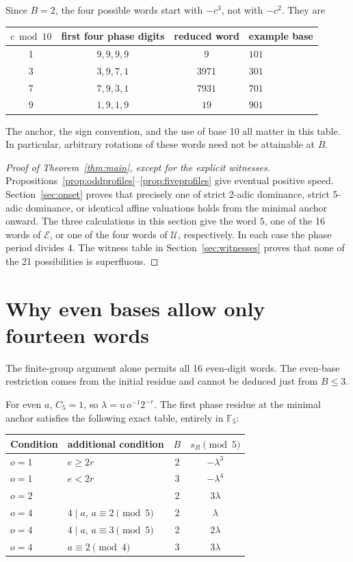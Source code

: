 \documentclass[11pt,letterpaper]{article}
\numberwithin{equation}{section}
\theoremstyle{definition}
\newcommand{\F}{\mathbb F}
\newcommand{\Eset}{\mathcal E}
\newcommand{\Uset}{\mathcal U}
\begin{document}
Since $B=2$, the four possible words start with $-c^3$, not with $-c^2$.
They are
\begin{center}
\begin{tabular}{cccl}
\toprule
$c\bmod10$ & first four phase digits & reduced word & example base\\
\midrule
1 & $9,9,9,9$ & $9$ & $101$\\
3 & $3,9,7,1$ & $3971$ & $301$\\
7 & $7,9,3,1$ & $7931$ & $701$\\
9 & $1,9,1,9$ & $19$ & $901$\\
\bottomrule
\end{tabular}
\end{center}
The anchor, the sign convention, and the use of base 10 all matter in this table.
In particular, arbitrary rotations of these words need not be attainable at
$B$.

\begin{proof}[Proof of Theorem~\ref{thm:main}, except for the explicit witnesses]
Propositions~\ref{prop:oddprofiles}--\ref{prop:fiveprofiles} give eventual
positive speed. Section~\ref{sec:onset} proves that precisely one of strict
2-adic dominance, strict 5-adic dominance, or identical affine valuations
holds from the minimal anchor onward. The three calculations in this section
give the word $5$, one of the 16 words of $\Eset$, or one of the four words
of $\Uset$, respectively. In each case the phase period divides 4.
The witness table in Section~\ref{sec:witnesses} proves that none of the
21 possibilities is superfluous.
\end{proof}

\section{Why even bases allow only fourteen words}\label{sec:evenproof}
The finite-group argument alone permits all 16 even-digit words. The even-base
restriction comes from the initial residue and cannot be deduced just from
$B\leq3$.

For even $a$, $C_5=1$, so $\lambda=u\,o^{-1}2^{-r}$. The first phase residue
at the minimal anchor satisfies the following exact table, entirely in
$\F_5$:
\begin{center}
\begin{tabular}{@{}llcc@{}}
\toprule
Condition & additional condition & $B$ & $s_B\pmod5$\\
\midrule
$o=1$ & $e\geq2r$ & 2 & $-\lambda^3$\\
$o=1$ & $e<2r$ & 3 & $-\lambda^4$\\
$o=2$ & & 2 & $3\lambda$\\
$o=4$ & $4\mid a$, $a\equiv2\pmod5$ & 2 & $\lambda$\\
$o=4$ & $4\mid a$, $a\equiv3\pmod5$ & 2 & $2\lambda$\\
$o=4$ & $a\equiv2\pmod4$ & 3 & $3\lambda$\\
\bottomrule
\end{tabular}
\end{center}
\end{document}
